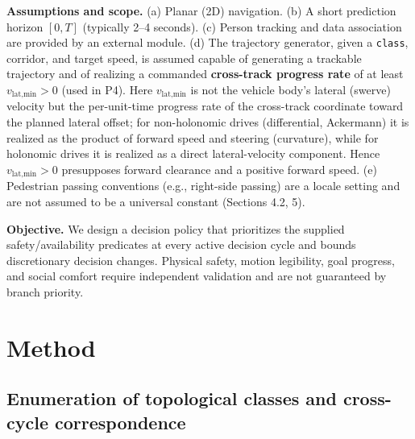 \documentclass[11pt]{article}
\newcommand{\Class}{\texttt{class}}
\begin{document}
\textbf{Assumptions and scope.} (a) Planar (2D) navigation. (b) A short prediction horizon $[0,T]$ (typically 2--4 seconds). (c) Person tracking and data association are provided by an external module. (d) The trajectory generator, given a \Class, corridor, and target speed, is assumed capable of generating a trackable trajectory and of realizing a commanded \textbf{cross-track progress rate} of at least $v_{\text{lat,min}} > 0$ (used in P4). Here $v_{\text{lat,min}}$ is not the vehicle body's lateral (swerve) velocity but the per-unit-time progress rate of the cross-track coordinate toward the planned lateral offset; for non-holonomic drives (differential, Ackermann) it is realized as the product of forward speed and steering (curvature), while for holonomic drives it is realized as a direct lateral-velocity component. Hence $v_{\text{lat,min}} > 0$ presupposes forward clearance and a positive forward speed. (e) Pedestrian passing conventions (e.g., right-side passing) are a locale setting and are not assumed to be a universal constant (Sections 4.2, 5).

\textbf{Objective.} We design a decision policy that prioritizes the supplied safety/availability predicates at every active decision cycle and bounds discretionary decision changes. Physical safety, motion legibility, goal progress, and social comfort require independent validation and are not guaranteed by branch priority.

\section{Method}

\FloatBarrier
\subsection{Enumeration of topological classes and cross-cycle correspondence}
\end{document}
